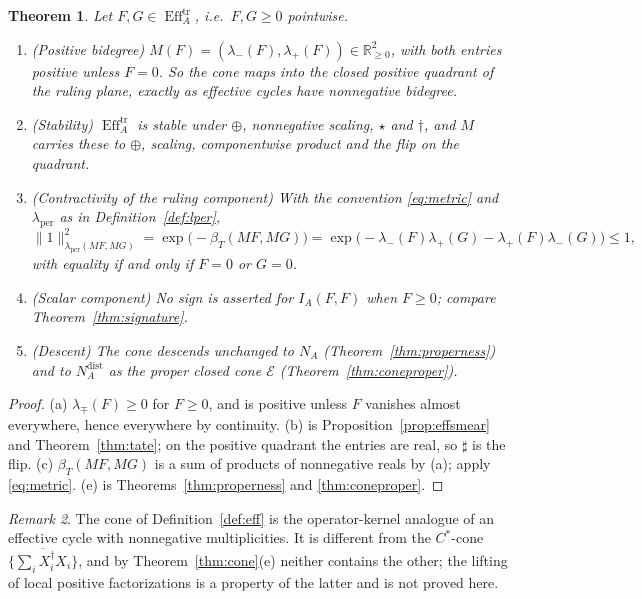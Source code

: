 \documentclass[11pt]{amsart}
\newtheorem{theorem}{Theorem}[section]
\theoremstyle{definition}
\theoremstyle{remark}
\newtheorem{remark}[theorem]{Remark}
\newcommand{\R}{\mathbb R}
\newcommand{\Eff}{\operatorname{Eff}}
\newcommand{\NAd}{N_A^{\mathrm{dist}}}
\begin{document}
\begin{theorem}\label{thm:coneRR}
Let $F,G\in\Eff_A^{\mathrm{tr}}$, i.e.\ $F,G\ge0$ pointwise.
\begin{enumerate}
\item[(a)] \emph{(Positive bidegree)}  $M(F)=(\lambda_-(F),\lambda_+(F))\in
\R_{\ge0}^{2}$, with both entries positive unless $F=0$.  So the cone maps into
the closed positive quadrant of the ruling plane, exactly as effective cycles
have nonnegative bidegree.
\item[(b)] \emph{(Stability)}  $\Eff_A^{\mathrm{tr}}$ is stable under $\oplus$,
nonnegative scaling, $\star$ and $\dagger$, and $M$ carries these to $\oplus$,
scaling, componentwise product and the flip on the quadrant.
\item[(c)] \emph{(Contractivity of the ruling component)}  With the convention
\eqref{eq:metric} and $\lambda_{\mathrm{per}}$ as in
Definition~\ref{def:lper},
\begin{equation}\label{eq:contractive}
\lVert1\rVert^{2}_{\lambda_{\mathrm{per}}(MF,MG)}=
\exp\bigl(-\beta_T(MF,MG)\bigr)
=\exp\bigl(-\lambda_-(F)\lambda_+(G)-\lambda_+(F)\lambda_-(G)\bigr)\le1,
\end{equation}
with equality if and only if $F=0$ or $G=0$.
\item[(d)] \emph{(Scalar component)}  No sign is asserted for $I_A(F,F)$
when $F\ge0$; compare Theorem~\ref{thm:signature}.
\item[(e)] \emph{(Descent)}  The cone descends unchanged to $N_A$
(Theorem~\ref{thm:properness}) and to $\NAd$ as the proper closed cone
$\mathcal E$ (Theorem~\ref{thm:coneproper}).
\end{enumerate}
\end{theorem}

\begin{proof}
(a)  $\lambda_{\mp}(F)\ge0$ for $F\ge0$, and is positive unless $F$ vanishes
almost everywhere, hence everywhere by continuity.  (b) is
Proposition~\ref{prop:effsmear} and Theorem~\ref{thm:tate}; on the positive
quadrant the entries are real, so $\sharp$ is the flip.  (c)
$\beta_T(MF,MG)$ is a sum of products of nonnegative reals by (a); apply
\eqref{eq:metric}.  (e) is Theorems~\ref{thm:properness} and
\ref{thm:coneproper}.
\end{proof}

\begin{remark}\label{rem:twocones}
The cone of Definition~\ref{def:eff} is the operator-kernel analogue of an
effective cycle with nonnegative multiplicities.  It is different from the
$C^{*}$-cone $\overline{\{\sum_iX_i^{\dagger}X_i\}}$, and by
Theorem~\ref{thm:cone}(e) neither contains the other; the lifting of local
positive factorizations is a property of the latter and is not proved here.
\end{remark}
\end{document}
